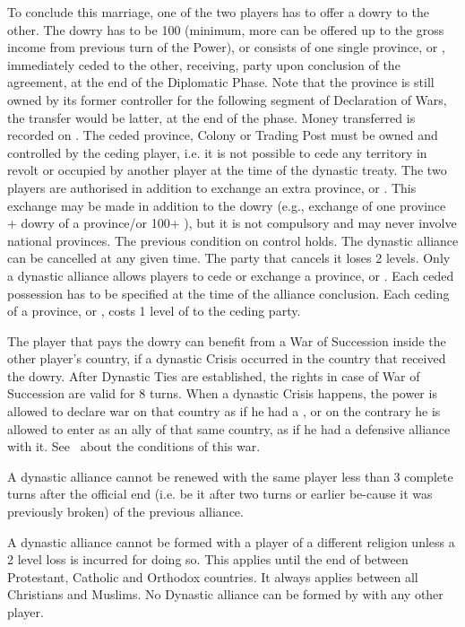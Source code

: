 \bparag To conclude this marriage, one of the two players has to offer a dowry
to the other. The dowry has to be 100 \ducats (minimum, more can be offered up
to the gross income from previous turn of the Power), or consists of one
single province, \COL or \TP, immediately ceded to the other, receiving, party
upon conclusion of the agreement, at the end of the Diplomatic Phase. Note
that the province is still owned by its former controller for the following
segment of Declaration of Wars, the transfer would be latter, at the end of
the phase.
\bparag Money transferred is recorded on .
\bparag The ceded province, Colony or Trading Post must be owned and
controlled by the ceding player, i.e. it is not possible to cede any territory
in revolt or occupied by another player at the time of the dynastic treaty.
\bparag
The two players are authorised in addition to exchange an extra province, \COL
or \TP. This exchange may be made in addition to the dowry (e.g., exchange of
one province + dowry of a province/or 100+ \ducats), but it is not compulsory
and may never involve national provinces. The previous condition on control
holds.
\bparag
The dynastic alliance can be cancelled at any given time. The party that
cancels it loses 2 \STAB levels.
\bparag
Only a dynastic alliance allows players to cede or exchange a province, \COL
or \TP. Each ceded possession has to be specified at the time of the alliance
conclusion.
\bparag Each ceding of a province, \COL or \TP, costs 1 level of \STAB to the
ceding party.

\label{chDiplo:succession}
The player that pays the dowry can benefit from a War of Succession inside the
other player's country, if a dynastic Crisis occurred in the country that
received the dowry. After Dynastic Ties are established, the rights in case of
War of Succession are valid for 8 turns. When a dynastic Crisis happens, the
power is allowed to declare war on that country as if he had a \CB, or on the
contrary he is allowed to enter as an ally of that same country, as if he had
a defensive alliance with it. See~ about
the conditions of this war.

\bparag A dynastic alliance cannot be renewed with the same player less than 3
complete turns after the official end (i.e. be it after two turns or earlier
be-cause it was previously broken) of the previous alliance.

\bparag A dynastic alliance cannot be formed with a player of a different
religion unless a 2 \STAB level loss is incurred for doing so. This applies
until the end of  between Protestant, Catholic and
Orthodox countries. It always applies between all Christians and Muslims.
No Dynastic alliance can be formed by \TUR with any other player.

